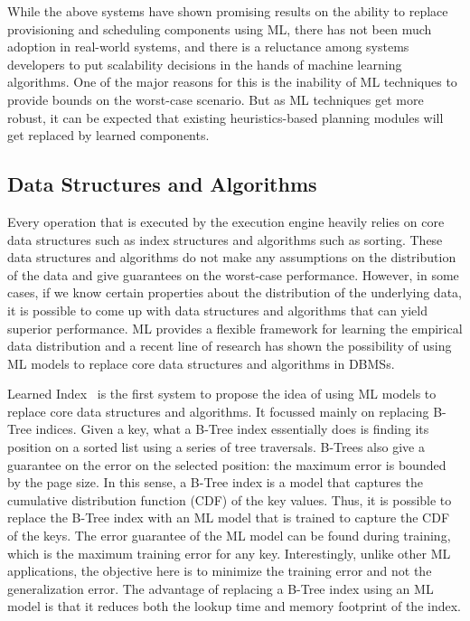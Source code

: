 While the above systems have shown promising results on the ability to replace provisioning and scheduling components using ML, there has not been much adoption in real-world systems, and there is a reluctance among systems developers to put scalability decisions in the hands of machine learning algorithms.
One of the major reasons for this is the inability of ML techniques to provide bounds on the worst-case scenario.
But as ML techniques get more robust, it can be expected that existing heuristics-based planning modules will get replaced by learned components.

\subsection{Data Structures and Algorithms}
Every operation that is executed by the execution engine heavily relies on core data structures such as index structures and algorithms such as sorting.
These data structures and algorithms do not make any assumptions on the distribution of the data and give guarantees on the worst-case performance.
However, in some cases, if we know certain properties about the distribution of the underlying data, it is possible to come up with data structures and algorithms that can yield superior performance.
ML provides a flexible framework for learning the empirical data distribution and a recent line of research has shown the possibility of using ML models to replace core data structures and algorithms in DBMSs.

Learned Index~\cite{learnedindex} is the first system to propose the idea of using ML models to replace core data structures and algorithms. It focussed mainly on replacing B-Tree indices. 
Given a key, what a B-Tree index essentially does is finding its position on a sorted list using a series of tree traversals.
B-Trees also give a guarantee on the error on the selected position: the maximum error is bounded by the page size.
In this sense, a B-Tree index is a model that captures the cumulative distribution function (CDF) of the key values.
Thus, it is possible to replace the B-Tree index with an ML model that is trained to capture the CDF of the keys.
The error guarantee of the ML model can be found during training, which is the maximum training error for any key.
Interestingly, unlike other ML applications, the objective here is to minimize the training error and not the generalization error.
The advantage of replacing a B-Tree index using an ML model is that it reduces both the lookup time and memory footprint of the index.

